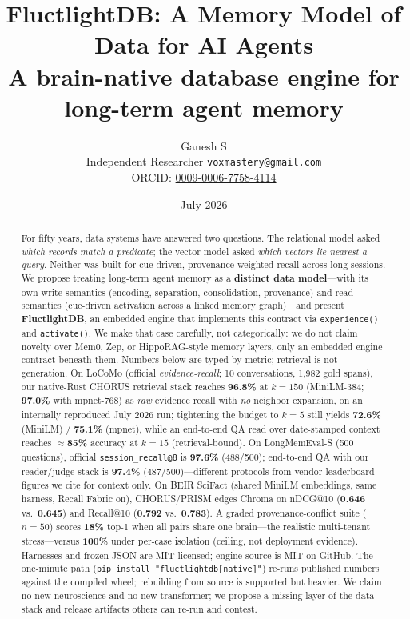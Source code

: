 \documentclass[11pt]{article}
\title{\textbf{FluctlightDB: A Memory Model of Data for AI Agents}\\[0.4em]
\large A brain-native database engine for long-term agent memory}
\author{Ganesh S\\ \small Independent Researcher \quad \texttt{voxmastery@gmail.com}\\[0.2em]
\small ORCID: \href{https://orcid.org/0009-0006-7758-4114}{0009-0006-7758-4114}}
\date{July 2026}
\begin{document}
\maketitle

\begin{abstract}
For fifty years, data systems have answered two questions. The relational model
asked \emph{which records match a predicate}; the vector model asked \emph{which
vectors lie nearest a query}. Neither was built for cue-driven, provenance-weighted
recall across long sessions. We propose treating long-term agent memory as a
\textbf{distinct data model}---with its own write semantics (encoding, separation,
consolidation, provenance) and read semantics (cue-driven activation across a
linked memory graph)---and present \textbf{FluctlightDB}, an embedded engine that
implements this contract via \texttt{experience()} and \texttt{activate()}. We
make that case carefully, not categorically: we do not claim novelty over Mem0,
Zep, or HippoRAG-style memory layers, only an embedded engine contract beneath them.
Numbers below are typed by metric; retrieval is not generation.
On LoCoMo (official \emph{evidence-recall}; 10 conversations, 1{,}982 gold spans),
our native-Rust CHORUS retrieval stack reaches \textbf{96.8\%} at $k{=}150$
(MiniLM-384; \textbf{97.0\%} with mpnet-768) as \emph{raw} evidence recall with
\emph{no} neighbor expansion, on an internally reproduced July 2026 run;
tightening the budget to $k{=}5$ still yields \textbf{72.6\%} (MiniLM) / \textbf{75.1\%} (mpnet),
while an end-to-end QA read over date-stamped context reaches $\approx$\textbf{85\%}
accuracy at $k{=}15$ (retrieval-bound).
On LongMemEval-S (500 questions), official \texttt{session\_recall@8} is
\textbf{97.6\%} (488/500); end-to-end QA with our reader/judge stack is
\textbf{97.4\%} (487/500)---different protocols from vendor leaderboard figures we
cite for context only.
On BEIR SciFact (shared MiniLM embeddings, same harness, Recall Fabric on),
CHORUS/PRISM edges Chroma on nDCG@10 (\textbf{0.646} vs.\ \textbf{0.645}) and
Recall@10 (\textbf{0.792} vs.\ \textbf{0.783}).
A graded provenance-conflict suite ($n{=}50$) scores \textbf{18\%} top-1 when all
pairs share one brain---the realistic multi-tenant stress---versus \textbf{100\%}
under per-case isolation (ceiling, not deployment evidence).
Harnesses and frozen JSON are MIT-licensed; engine source is MIT on GitHub.
The one-minute path (\texttt{pip install "fluctlightdb[native]"}) re-runs published
numbers against the compiled wheel; rebuilding from source is supported but heavier.
We claim no new neuroscience and no new transformer; we propose a missing layer of
the data stack and release artifacts others can re-run and contest.
\end{abstract}
\end{document}
